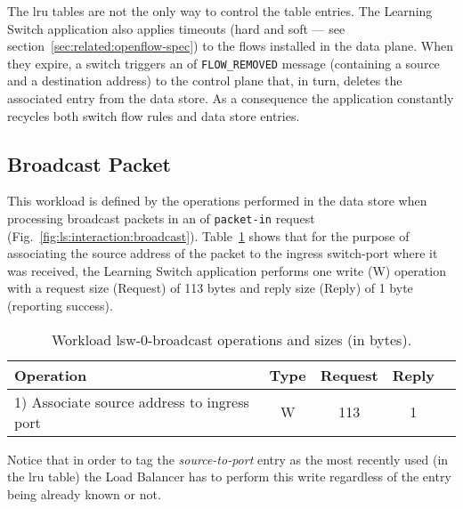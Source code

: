 The \gls{lru} tables are not the only way to control the table entries. The Learning Switch application also applies timeouts (hard and soft --- see section~\ref{sec:related:openflow-spec})  to the flows installed in the data plane. 
When they expire, a switch triggers an \gls{of} \texttt{FLOW\_REMOVED} message (containing a source and a destination address) to the control plane that, in turn, deletes the associated entry from the data store. 
As a consequence the application constantly recycles both switch flow rules and data store entries. 

\subsection{Broadcast Packet}
This workload is defined by  the operations performed in the data store when processing broadcast packets in an \acrfull{of} \texttt{packet-in} request (Fig.~\ref{fig:ls:interaction:broadcast}). Table~\ref{table:lsw0:broadcast} shows that for the purpose of associating the source address of the packet to the ingress switch-port where it was received, the Learning Switch application performs one write (W) operation with a request size (Request) of 113 bytes and reply size (Reply) of 1 byte (reporting success). 

\begin{table}[ht]
\small
\centering 
\begin{tabular}{l c c c c}
 Operation & Type & Request & Reply \\ \toprule 
1) Associate source address to ingress port & W & 113 & 1 \\ \bottomrule
\end{tabular}
\caption[Workload lsw-0-broadcast operations]{Workload lsw-0-broadcast operations and sizes (in bytes).}
\label{table:lsw0:broadcast}
\end{table}


Notice that in order to tag the \emph{source-to-port} entry as the most recently used (in the \gls{lru} table) the Load Balancer has to perform this write regardless of the entry being already known or not. 
